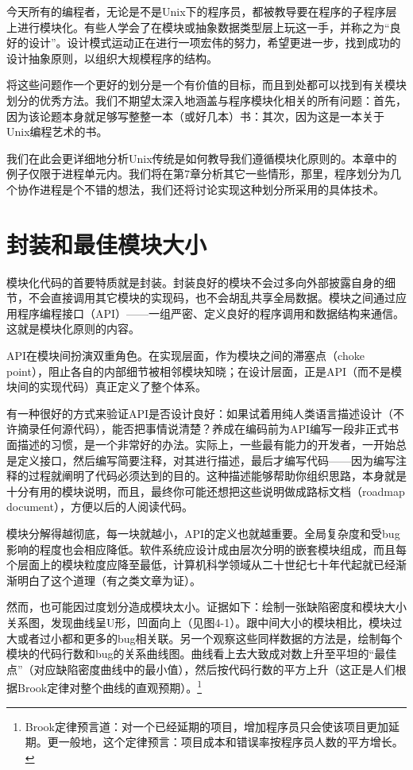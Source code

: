 \documentclass[12pt,oneside]{book}
\begin{document}
\begin{common-format}
今天所有的编程者，无论是不是Unix下的程序员，都被教导要在程序的子程序层上进行模块化。有些人学会了在模块或抽象数据类型层上玩这一手，并称之为“良好的设计”。设计模式运动正在进行一项宏伟的努力，希望更进一步，找到成功的设计抽象原则，以组织大规模程序的结构。

将这些问题作一个更好的划分是一个有价值的目标，而且到处都可以找到有关模块划分的优秀方法。我们不期望太深入地涵盖与程序模块化相关的所有问题：首先，因为该论题本身就足够写整整一本（或好几本）书：其次，因为这是一本关于Unix编程艺术的书。

我们在此会更详细地分析Unix传统是如何教导我们遵循模块化原则的。本章中的例子仅限于进程单元内。我们将在第7章分析其它一些情形，那里，程序划分为几个协作进程是个不错的想法，我们还将讨论实现这种划分所采用的具体技术。


\section{封装和最佳模块大小}
模块化代码的首要特质就是封装。封装良好的模块不会过多向外部披露自身的细节，不会直接调用其它模块的实现码，也不会胡乱共享全局数据。模块之间通过应用程序编程接口（API）——一组严密、定义良好的程序调用和数据结构来通信。这就是模块化原则的内容。

API在模块间扮演双重角色。在实现层面，作为模块之间的滞塞点（choke point），阻止各自的内部细节被相邻模块知晓；在设计层面，正是API（而不是模块间的实现代码）真正定义了整个体系。

有一种很好的方式来验证API是否设计良好：如果试着用纯人类语言描述设计（不许摘录任何源代码），能否把事情说清楚？养成在编码前为API编写一段非正式书面描述的习惯，是一个非常好的办法。实际上，一些最有能力的开发者，一开始总是定义接口，然后编写简要注释，对其进行描述，最后才编写代码——因为编写注释的过程就阐明了代码必须达到的目的。这种描述能够帮助你组织思路，本身就是十分有用的模块说明，而且，最终你可能还想把这些说明做成路标文档（roadmap document），方便以后的人阅读代码。

模块分解得越彻底，每一块就越小，API的定义也就越重要。全局复杂度和受bug影响的程度也会相应降低。软件系统应设计成由层次分明的嵌套模块组成，而且每个层面上的模块粒度应降至最低，计算机科学领域从二十世纪七十年代起就已经渐渐明白了这个道理（有\cite{Parnas}之类文章为证）。

然而，也可能因过度划分造成模块太小。证据\cite{Hatton97}如下：绘制一张缺陷密度和模块大小关系图，发现曲线呈U形，凹面向上（见图4-1）。跟中间大小的模块相比，模块过大或者过小都和更多的bug相关联。另一个观察这些同样数据的方法是，绘制每个模块的代码行数和bug的关系曲线图。曲线看上去大致成对数上升至平坦的“最佳点”（对应缺陷密度曲线中的最小值），然后按代码行数的平方上升（这正是人们根据Brook定律对整个曲线的直观预期）。\footnote{ Brook定律预言道：对一个已经延期的项目，增加程序员只会使该项目更加延期。更一般地，这个定律预言：项目成本和错误率按程序员人数的平方增长。}


\end{common-format}
\end{document}
